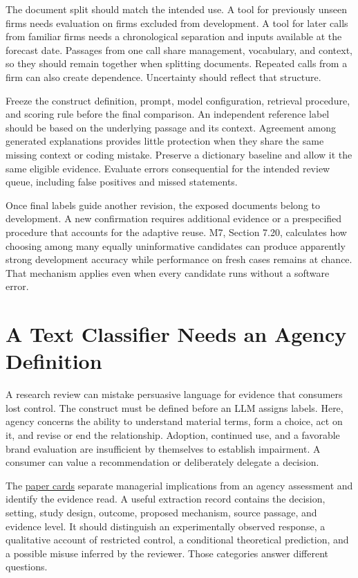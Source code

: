 The document split should match the intended use. A tool for previously
unseen firms needs evaluation on firms excluded from development. A tool
for later calls from familiar firms needs a chronological separation and
inputs available at the forecast date. Passages from one call share
management, vocabulary, and context, so they should remain together when
splitting documents. Repeated calls from a firm can also create
dependence. Uncertainty should reflect that structure.

Freeze the construct definition, prompt, model configuration, retrieval
procedure, and scoring rule before the final comparison. An independent
reference label should be based on the underlying passage and its
context. Agreement among generated explanations provides little
protection when they share the same missing context or coding mistake.
Preserve a dictionary baseline and allow it the same eligible evidence.
Evaluate errors consequential for the intended review queue, including
false positives and missed statements.

Once final labels guide another revision, the exposed documents belong
to development. A new confirmation requires additional evidence or a
prespecified procedure that accounts for the adaptive reuse. M7, Section
7.20, calculates how choosing among many equally uninformative
candidates can produce apparently strong development accuracy while
performance on fresh cases remains at chance. That mechanism applies
even when every candidate runs without a software error.

\hypertarget{M05-a-text-classifier-needs-an-agency-definition}{%
\section{A Text Classifier Needs an Agency
Definition}\label{M05-a-text-classifier-needs-an-agency-definition}}

\noindent \noindent A research review can mistake persuasive language for evidence
that consumers lost control. The construct must be defined before an LLM
assigns labels. Here, agency concerns the ability to understand material
terms, form a choice, act on it, and revise or end the relationship.
Adoption, continued use, and a favorable brand evaluation are
insufficient by themselves to establish impairment. A consumer can value
a recommendation or deliberately delegate a decision.

The
\href{../01_Resources/13_Consumer_Agency_and_Recent_Research/CATALOG.md}{paper
cards} separate managerial implications from an agency assessment and
identify the evidence read. A useful extraction record contains the
decision, setting, study design, outcome, proposed mechanism, source
passage, and evidence level. It should distinguish an experimentally
observed response, a qualitative account of restricted control, a
conditional theoretical prediction, and a possible misuse inferred by
the reviewer. Those categories answer different questions.

